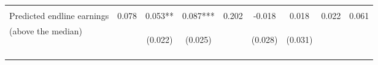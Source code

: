 \begin{tabular}{lcccccccc}
\hline
\\
Predicted endline earnings & 0.078 & 0.053** & 0.087*** & 0.202 & -0.018 & 0.018 & 0.022 & 0.061\\
(above the median) & & \begin{footnotesize}(0.022)\end{footnotesize} & \begin{footnotesize}(0.025)\end{footnotesize} &&
\begin{footnotesize}(0.028)\end{footnotesize} & \begin{footnotesize}(0.031)\end{footnotesize}\\
\noalign{\smallskip}\hline\end{tabular}
